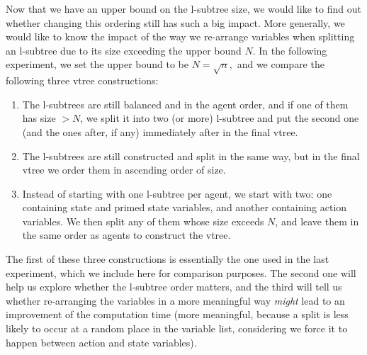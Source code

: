 \documentclass[11pt]{report}
\begin{document}
Now that we have an upper bound on the l-subtree size, we would like to find out whether changing this ordering still has such a big impact. More generally, we would like to know the impact of the way we re-arrange variables when splitting an l-subtree due to its size exceeding the upper bound $N$. In the following experiment, we set the upper bound to be $N = \sqrt{n},$ and we compare the following three vtree constructions: 
\begin{enumerate}
\item The l-subtrees are still balanced and in the agent order, and if one of them has size $> N$, we split it into two (or more) l-subtree and put the second one (and the ones after, if any) immediately after in the final vtree.
\item The l-subtrees are still constructed and split in the same way, but in the final vtree we order them in ascending order of size. 
\item Instead of starting with one l-subtree per agent, we start with two: one containing state and primed state variables, and another containing action variables. We then split any of them whose size exceeds $N$, and leave them in the same order as agents to construct the vtree. 
\end{enumerate}
The first of these three constructions is essentially the one used in the last experiment, which we include here for comparison purposes. The second one will help us explore whether the l-subtree order matters, and the third will tell us whether re-arranging the variables in a more meaningful way \textit{might} lead to an improvement of the computation time (more meaningful, because a split is less likely to occur at a random place in the variable list, considering we force it to happen between action and state variables).
\end{document}

